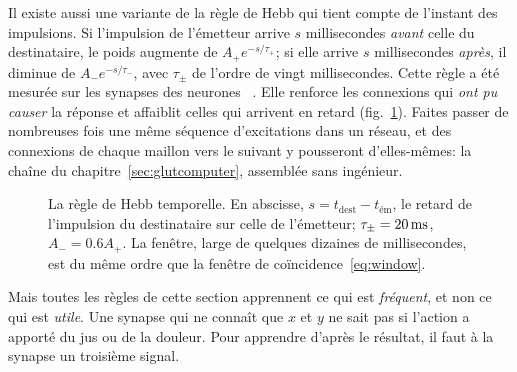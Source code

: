 Il existe aussi une variante de la règle de Hebb qui tient compte de l'instant des impulsions. Si l'impulsion de l'émetteur arrive $s$ millisecondes \emph{avant} celle du destinataire, le poids augmente de $A_+e^{-s/\tau_+}$; si elle arrive $s$ millisecondes \emph{après}, il diminue de $A_-e^{-s/\tau_-}$, avec $\tau_\pm$ de l'ordre de vingt millisecondes. Cette règle a été mesurée sur les synapses des neurones ~\cite{BiPoo1998}. Elle renforce les connexions qui \emph{ont pu causer} la réponse et affaiblit celles qui arrivent en retard (fig.~\ref{fig:stdp}). Faites passer de nombreuses fois une même séquence d'excitations dans un réseau, et des connexions de chaque maillon vers le suivant y pousseront d'elles-mêmes: la chaîne du chapitre~\ref{sec:glutcomputer}, assemblée sans ingénieur.

\begin{figure}[t]
\centering
{}
\caption{La règle de Hebb temporelle. En abscisse, $s=t_{\text{dest}}-t_{\text{ém}}$, le retard de l'impulsion du destinataire sur celle de l'émetteur; $\tau_\pm=20\,\text{ms}$, $A_-=0.6A_+$. La fenêtre, large de quelques dizaines de millisecondes, est du même ordre que la fenêtre de coïncidence~\eqref{eq:window}.}
\label{fig:stdp}
\end{figure}

Mais toutes les règles de cette section apprennent ce qui est \emph{fréquent}, et non ce qui est \emph{utile}. Une synapse qui ne connaît que $x$ et $y$ ne sait pas si l'action a apporté du jus ou de la douleur. Pour apprendre d'après le résultat, il faut à la synapse un troisième signal.

